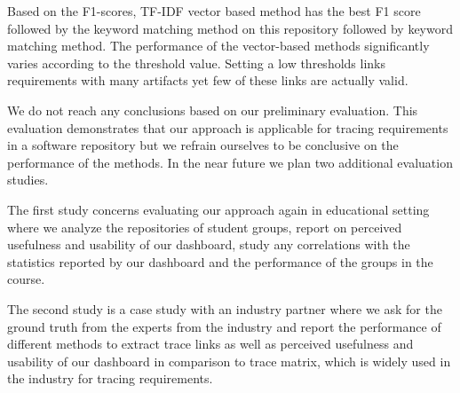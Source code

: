Based on the F1-scores, TF-IDF vector based method has the best F1 score followed by the keyword matching method on this repository followed by keyword matching method. The performance of the vector-based methods  significantly varies according to the threshold value. Setting a low thresholds links requirements with many artifacts yet few of these links are actually valid.




We do not reach any conclusions based on our preliminary evaluation. This evaluation demonstrates that our approach is applicable for tracing requirements in a software repository but we refrain ourselves to be conclusive on the performance of the methods. In the near future we plan two additional evaluation studies.

The first study concerns evaluating our approach again in educational setting where we analyze the repositories of student groups, report on perceived usefulness and usability of our dashboard, study any correlations with the statistics reported by our dashboard and the performance of the groups in the course.

The second study is a case study with an industry partner where we ask for the ground truth from the experts from the industry and report the performance of different methods to extract trace links as well as perceived usefulness and usability of our dashboard in comparison to trace matrix, which is widely used in the industry for tracing requirements.

